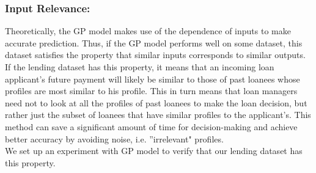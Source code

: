 \documentclass[a4paper]{article}
\theoremstyle{genius}
\begin{document}
\subsubsection{Input Relevance:}
Theoretically, the GP model makes use of the dependence of inputs to make accurate prediction. Thus, if the GP model performs well on some dataset, this dataset satisfies the property that similar inputs corresponds to similar outputs. If the lending dataset has this property, it means that an incoming loan applicant's future payment will likely be similar to those of past loanees whose profiles are most similar to his profile. This in turn means that loan managers need not to look at all the profiles of past loanees to make the loan decision, but rather just the subset of loanees that have similar profiles to the applicant's. This method can save a significant amount of time for decision-making and achieve better accuracy by avoiding noise, i.e. ''irrelevant" profiles.\\
We set up an experiment with GP model to verify that our lending dataset has this property.
\end{document}
